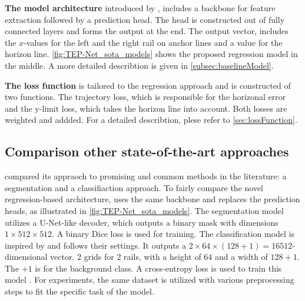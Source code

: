 \vspace{1cm} %

\noindent \textbf{The model architecture} introduced by \cite{tepNet2024}, includes a backbone for feature extraction followed by a prediction head.
The head is constructed out of fully connected layers and forms the output at the end.
The output vector, includes the $x$-values for the left and the right rail on anchor lines and a value for the horizon line.
\autoref{fig:TEP-Net_sota_models} shows the proposed regression model in the middle.
A more detailed describtion is given in \autoref{subsec:baselineModel}.

\vspace{1cm} %

\noindent \textbf{The loss function} is tailored to the regression approach and is constructed of two functions.
The trajectory loss, which is responsible for the horizonal error and the y-limit loss, which takes the horizon line into account.
Both losses are weighted and addded.
For a detailed describtion, plese refer to \autoref{sec:lossFunction}.

\subsection{Comparison other state-of-the-art approaches}

\cite{tepNet2024} compared its appraoch to promising and common methods in the literature: a segmentation and a classifiaction approach.
To fairly compare the novel regression-based architecture, \cite{tepNet2024} uses the same backbone and replaces the prediction heads, as illustrated in \autoref{fig:TEP-Net_sota_models}.
The segmentation model utilizes a U-Net-like \cite{uNet2015} decoder, which outputs a binary mask with dimensions $1 \times 512 \times 512$.
A binary Dice loss is used for training.
The classification model is inspired by \cite{li2022rail} and follows their settings.
It outputs a $2 \times 64 \times (128 + 1) = 16512$-dimensional vector.
$2$ grids for 2 rails, with a height of $64$ and a width of $128+1$.
The $+1$ is for the background class.
A cross-entropy loss is used to train this model \cite{tepNet2024}.
For experiments, the same dataset is utilized with various preprocessing steps to fit the specific task of the model.


